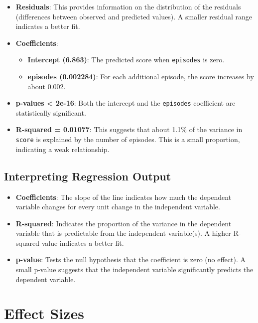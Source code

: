 \documentclass[
]{book}
\providecommand{\tightlist}{%
  \setlength{\itemsep}{0pt}\setlength{\parskip}{0pt}}
\begin{document}
\begin{itemize}
\tightlist
\item
  \textbf{Residuals}: This provides information on the distribution of the residuals (differences between observed and predicted values). A smaller residual range indicates a better fit.
\item
  \textbf{Coefficients}:

  \begin{itemize}
  \tightlist
  \item
    \textbf{Intercept (6.863)}: The predicted score when \texttt{episodes} is zero.
  \item
    \textbf{episodes (0.002284)}: For each additional episode, the score increases by about 0.002.
  \end{itemize}
\item
  \textbf{p-values \textless{} 2e-16}: Both the intercept and the \texttt{episodes} coefficient are statistically significant.
\item
  \textbf{R-squared = 0.01077}: This suggests that about 1.1\% of the variance in \texttt{score} is explained by the number of episodes. This is a small proportion, indicating a weak relationship.
\end{itemize}

\subsection*{Interpreting Regression Output}\label{interpreting-regression-output}

\begin{itemize}
\tightlist
\item
  \textbf{Coefficients}: The slope of the line indicates how much the dependent variable changes for every unit change in the independent variable.
\item
  \textbf{R-squared}: Indicates the proportion of the variance in the dependent variable that is predictable from the independent variable(s). A higher R-squared value indicates a better fit.
\item
  \textbf{p-value}: Tests the null hypothesis that the coefficient is zero (no effect). A small p-value suggests that the independent variable significantly predicts the dependent variable.
\end{itemize}

\section{Effect Sizes}\label{effect-sizes}
\end{document}
